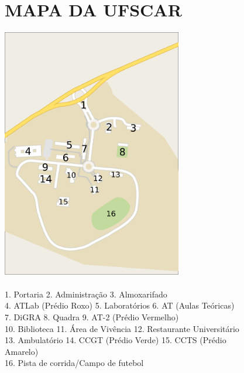\begin{figure}
  \section{MAPA DA UFSCAR}
  \centering
  \includegraphics[width=0.70\textwidth]{./imagem/image.pdf}
  \caption{\\1. Portaria 2. Administração 3. Almoxarifado\\4. ATLab (Prédio Roxo) 5. Laboratórios 6. AT (Aulas Teóricas)\\7. DiGRA 8. Quadra 9. AT-2 (Prédio Vermelho)\\10. Biblioteca 11. Área de Vivência 12. Restaurante Universitário\\13. Ambulatório 14. CCGT (Prédio Verde) 15. CCTS (Prédio Amarelo)\\16. Pista de corrida/Campo de futebol }
\end{figure}
